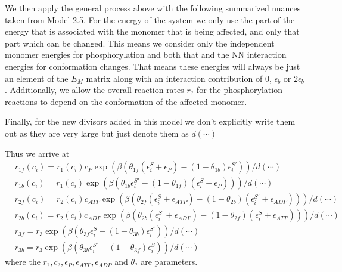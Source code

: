 \documentclass[11pt]{article}
\begin{document}
\begin{tcolorbox}
	We then apply the general process above with the following summarized nuances taken from Model 2.5.
	For the energy of the system we only use the part of the energy that is associated with the monomer that is being affected, and only that part which can be changed.
	This means we consider only the independent monomer energies for phosphorylation and both that and the NN interaction energies for conformation changes.
	That means these energies will always be just an element of the $E_M$ matrix along with an interaction contribution of 0, $\epsilon_b$ or $2\epsilon_b$.
	Additionally, we allow the overall reaction rates $r_?$ for the phosphorylation reactions to depend on the conformation of the affected monomer.

    Finally, for the new divisors added in this model we don't explicitly write them out as they are very large but just denote them as $d(\cdots)$

	Thus we arrive at
	\begin{align}
        & r_{1f}(c_i) = r_1(c_i)c_P\exp(\beta(\theta_{1f}(\epsilon_i^S+\epsilon_P)-(1-\theta_{1b})\epsilon_i^{S'})) / d(\cdots) \label{eq:rate1f}                          \\
         & r_{1b}(c_i) = r_1(c_i)\exp(\beta(\theta_{1b}\epsilon_i^{S'}-(1-\theta_{1f})(\epsilon_i^S+\epsilon_P))) / d(\cdots) \label{eq:rate1b}                             \\
         & r_{2f}(c_i) = r_2(c_i)c_{ATP}\exp(\beta(\theta_{2f}(\epsilon_i^S+\epsilon_{ATP})-(1-\theta_{2b})(\epsilon_i^{S'}+\epsilon_{ADP}))) / d(\cdots) \label{eq:rate2f} \\
         & r_{2b}(c_i) = r_2(c_i)c_{ADP}\exp(\beta(\theta_{2b}(\epsilon_i^{S'}+\epsilon_{ADP})-(1-\theta_{2f})(\epsilon_i^S+\epsilon_{ATP}))) / d(\cdots) \label{eq:rate2b} \\
         & r_{3f} = r_3\exp(\beta(\theta_{3f}\epsilon_i^S-(1-\theta_{3b})\epsilon_i^{S'})) / d(\cdots) \label{eq:rate3f}                                                    \\
         & r_{3b} = r_3\exp(\beta(\theta_{3b}\epsilon_i^{S'}-(1-\theta_{3f})\epsilon_i^S)) / d(\cdots) \label{eq:rate3b}
	\end{align}
	where the $r_?,c_?,\epsilon_P,\epsilon_{ATP},\epsilon_{ADP}$ and $\theta_?$ are parameters.
\end{tcolorbox}
\end{document}
